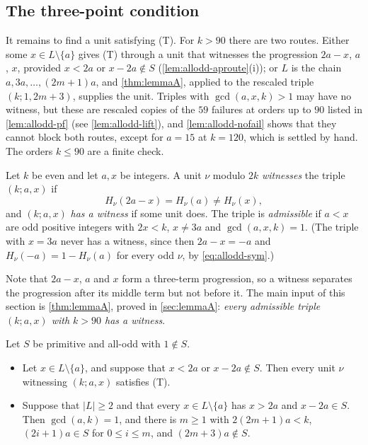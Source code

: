 \subsection{The three-point condition}
\label{sec:allodd-e3}

It remains to find a unit satisfying (T). For $k>90$ there are
two routes. Either some $x\in L\setminus\{a\}$ gives (T) through a unit that
witnesses the progression $2a-x$, $a$, $x$, provided $x<2a$ or
$x-2a\notin S$ (\autoref{lem:allodd-aproute}(i));
or $L$ is the chain $a,3a,\dots,(2m+1)a$, and \autoref{thm:lemmaA}, applied
to the rescaled triple $(k;1,2m+3)$, supplies the unit. Triples with
$\gcd(a,x,k)>1$ may have no witness, but these are rescaled copies of the $59$
failures at orders up to $90$ listed in \autoref{lem:allodd-pf} (see
\autoref{lem:allodd-lift}), and \autoref{lem:allodd-nofail} shows that they
cannot block both routes, except for $a=15$ at $k=120$, which is settled by
hand. The orders $k\le90$ are a finite check.

\begin{definition}
\label{def:allodd-adm}
Let $k$ be even and let $a,x$ be integers. A unit $\nu$ modulo $2k$
\emph{witnesses} the triple $(k;a,x)$ if
\begin{equation}
H_\nu(2a-x)=H_\nu(a)\ne H_\nu(x),
\label{eq:allodd-ap}
\end{equation}
and $(k;a,x)$ \emph{has a witness} if some unit does. The triple is
\emph{admissible} if $a<x$ are odd positive integers with $2x<k$, $x\ne3a$
and $\gcd(a,x,k)=1$. (The triple with $x=3a$ never has a witness, since then
$2a-x=-a$ and $H_\nu(-a)=1-H_\nu(a)$ for every odd $\nu$, by
\eqref{eq:allodd-sym}.)
\end{definition}

Note that $2a-x$, $a$ and $x$ form a three-term progression, so a witness
separates the progression after its middle term but not before it. The main
input of this section is \autoref{thm:lemmaA}, proved in
\autoref{sec:lemmaA}: \emph{every admissible triple $(k;a,x)$ with $k>90$ has
a witness}.

\begin{lemma}
\label{lem:allodd-aproute}
Let $S$ be primitive and all-odd with $1\notin S$.
\begin{itemize}
\item[(i)] Let $x\in L\setminus\{a\}$, and suppose that $x<2a$ or
$x-2a\notin S$. Then every unit $\nu$ witnessing $(k;a,x)$ satisfies (T).
\item[(ii)] Suppose that $|L|\ge2$ and that every $x\in L\setminus\{a\}$ has
$x>2a$ and $x-2a\in S$. Then $\gcd(a,k)=1$, and there is $m\ge1$ with
$2(2m+1)a<k$, $(2i+1)a\in S$ for $0\le i\le m$, and $(2m+3)a\notin S$.
\end{itemize}
\end{lemma}

